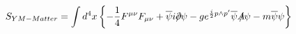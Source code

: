 \begin{equation}
S_{YM-Matter}=\int
d^{4}x\left\{-\frac{1}{4}F^{\mu\nu}F_{\mu\nu}+\overline{\psi}i\partial\hspace{-0.2cm}/\psi
-ge^{\frac{i}{2}p\wedge
p'}\overline{\psi}A\hspace{-0.2cm}/\psi-m\overline{\psi}\psi\right\}
\end{equation}

